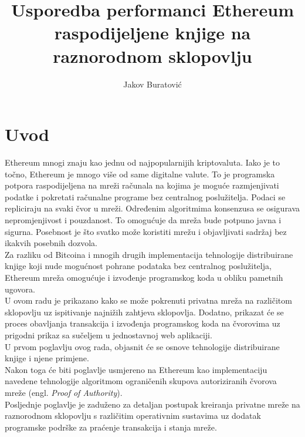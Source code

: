 \documentclass[times, utf8, zavrsni, numeric]{fer}
\begin{document}

\title{Usporedba performanci Ethereum raspodijeljene knjige na raznorodnom sklopovlju}

\author{Jakov Buratović}

\maketitle

\izvornik


\tableofcontents

\chapter{Uvod}
Ethereum mnogi znaju kao jednu od najpopularnijih kriptovaluta. Iako je to točno, Ethereum je mnogo
više od same digitalne valute. To je programska potpora raspodijeljena na mreži računala na kojima je
moguće razmjenjivati podatke i pokretati računalne programe bez centralnog poslužitelja. 
Podaci se repliciraju na svaki čvor u mreži. Određenim algoritmima konsenzusa se osigurava 
nepromjenjivost i pouzdanost. 
To omogućuje da mreža bude potpuno javna i sigurna. Posebnost je što svatko može koristiti
mrežu i objavljivati sadržaj bez ikakvih posebnih dozvola. \\ Za razliku od Bitcoina
i mnogih drugih implementacija tehnologije distribuirane knjige koji nude mogućnost pohrane podataka
bez centralnog poslužitelja, Ethereum mreža omogućuje i izvođenje programskog koda u obliku pametnih ugovora.\\
U ovom radu je prikazano kako se može pokrenuti privatna mreža na različitom sklopovlju uz  ispitivanje najnižih zahtjeva sklopovlja.
Dodatno, prikazat će se proces obavljanja transakcija i izvođenja programskog koda na čvorovima uz prigodni prikaz sa sučeljem u jednostavnoj web aplikaciji.\\
U prvom poglavlju ovog rada, objasnit će se osnove tehnologije distribuirane knjige i njene primjene.\\
Nakon toga će biti poglavlje usmjereno na Ethereum kao implementaciju navedene tehnologije algoritmom ograničenih skupova autoriziranih čvorova mreže (engl. \emph{Proof of Authority}). \\
Posljednje poglavlje je zaduženo za detaljan postupak kreiranja privatne mreže na raznorodnom sklopovlju
s različitim operativnim sustavima uz dodatak programske podrške za praćenje transakcija i stanja mreže.  
\end{document}
